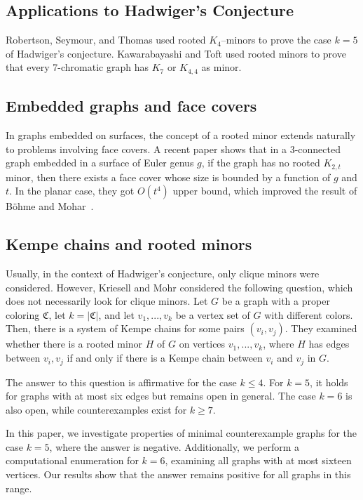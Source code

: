 \subsection*{Applications to Hadwiger's Conjecture}
Robertson, Seymour, and Thomas \cite{robertson_seymour_1993} used rooted $K_4$–minors to prove the case $k=5$ of Hadwiger's conjecture.
Kawarabayashi and Toft \cite{Kawarabayashi2005} used rooted minors to prove that every 7-chromatic graph has $K_7$ or $K_{4,4}$ as minor.

\subsection*{Embedded graphs and face covers}
In graphs embedded on surfaces, the concept of a rooted minor extends naturally to problems involving
face covers. A recent paper \cite{Fiorini2025} shows that in a 3-connected
graph embedded in a surface of Euler genus $g$, if the graph has no rooted $K_{2,t}$ minor,
then there exists a face cover whose size is bounded by a function of $g$ and $t$. 
In the planar case, they got $O(t^4)$ upper bound, which improved the result of Böhme and Mohar~\cite{BOHME2002291}.

\subsection*{Kempe chains and rooted minors}
Usually, in the context of Hadwiger's conjecture, only clique minors were considered. However, Kriesell and Mohr \cite{matthias_2022} considered
the following question, which does not necessarily look for clique minors. Let $G$ be a graph with a proper coloring
$\mathfrak{C}$, let $k = |\mathfrak{C}|$, and let $v_1, ..., v_{k}$ be a vertex set of $G$ with different colors.
Then, there is a system of Kempe chains for some pairs $(v_i, v_j)$.
They examined whether there is a rooted minor $H$ of $G$ on vertices $v_1, ..., v_{k}$, where $H$ has edges between 
$v_i, v_j$ if and only if there is a Kempe chain between $v_i$ and $v_j$ in $G$.

The answer to this question is affirmative for the case $k \leq 4$. For $k = 5$,
it holds for graphs with at most six edges but remains open in general.
The case $k = 6$ is also open, while counterexamples exist for $k \geq 7$.

In this paper, we investigate properties of minimal counterexample graphs for the case $k = 5$, where the answer is negative.
Additionally, we perform a computational enumeration for $k = 6$, examining all graphs with at most sixteen vertices.
Our results show that the answer remains positive for all graphs in this range.

